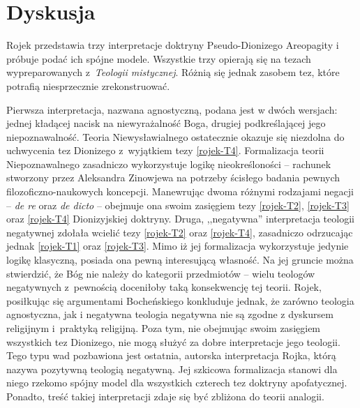 \section{Dyskusja}\label{roj-dyskusja}

Rojek przedstawia trzy interpretacje doktryny Pseudo-Dionizego Areopagity i próbuje podać
ich spójne modele. Wszystkie trzy opierają się na tezach
wypreparowanych z~\textit{Teologii mistycznej}. Różnią się jednak zasobem tez, które potrafią niesprzecznie
zrekonstruować.

Pierwsza interpretacja, nazwana agnostyczną, podana jest w dwóch
wersjach: jednej kładącej nacisk na niewyrażalność Boga, drugiej
podkreślającej jego niepoznawalność. Teoria Niewysławialnego ostatecznie okazuje
się niezdolna do uchwycenia tez Dionizego z~wyjątkiem tezy \eqref{rojek-T4}.
Formalizacja teorii Niepoznawalnego zasadniczo wykorzystuje logikę
nieokreśloności -- rachunek stworzony przez Aleksandra Zinowjewa na
potrzeby ścisłego badania pewnych filozoficzno-naukowych koncepcji.
Manewrując dwoma różnymi rodzajami negacji -- \textit{de re} oraz
\textit{de dicto} -- obejmuje ona swoim zasięgiem 
tezy \eqref{rojek-T2}, \eqref{rojek-T3} oraz \eqref{rojek-T4} Dionizyjskiej doktryny.
%
Druga, ,,negatywna'' interpretacja teologii negatywnej zdołała wcielić
tezy \eqref{rojek-T2} oraz \eqref{rojek-T4}, zasadniczo odrzucając jednak \eqref{rojek-T1} oraz \eqref{rojek-T3}. Mimo
iż jej formalizacja wykorzystuje jedynie logikę klasyczną, posiada ona
pewną interesującą własność. Na jej gruncie można stwierdzić, że Bóg
nie należy do kategorii przedmiotów -- wielu teologów negatywnych z~pewnością doceniłoby taką konsekwencję tej teorii.  Rojek, posiłkując się argumentami Bocheńskiego konkluduje jednak, że zarówno
teologia agnostyczna, jak i negatywna teologia negatywna nie są zgodne z
dyskursem religijnym i~praktyką religijną. Poza tym, nie obejmując
swoim zasięgiem wszystkich tez Dionizego, nie mogą służyć za dobre
interpretacje jego teologii.
%
Tego typu wad pozbawiona jest ostatnia, autorska
interpretacja Rojka, którą nazywa pozytywną teologią negatywną. Jej szkicowa
formalizacja stanowi dla niego rzekomo spójny model dla wszystkich czterech tez doktryny
apofatycznej. Ponadto, treść takiej interpretacji zdaje się być zbliżona do teorii analogii.


